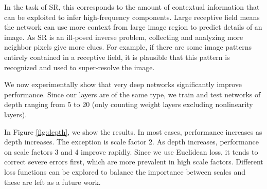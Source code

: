 \documentclass[10pt,twocolumn,letterpaper]{article}
\begin{document}
In the task of SR, this corresponds to the amount of contextual information that can be exploited to infer high-frequency components. Large receptive field means the network can use more context from large image region to predict details of an image. As SR is an ill-posed inverse problem, collecting and analyzing more neighbor pixels give more clues. For example, if there are some image patterns entirely contained in a receptive field, it is plausible that this pattern is recognized and used to super-resolve the image. 

We now experimentally show that very deep networks significantly improve performance.  Since our layers are of the same type, we train and test networks of depth ranging from 5 to 20 (only counting weight layers excluding nonlinearity layers). 

In Figure \ref{fig:depth}, we show the results. In most cases, performance increases as depth increases. The exception is scale factor 2. As depth increases, performance on scale factors 3 and 4 improve rapidly. Since we use Euclidean loss, it tends to correct severe errors first, which are more prevalent in high scale factors. Different loss functions can be explored to balance the importance between scales and these are left as a future work. 
\end{document}
